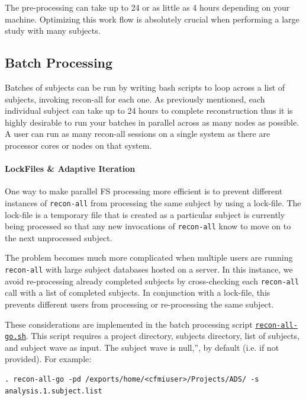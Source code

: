 \documentclass[paper=a4, fontsize=11pt]{scrartcl} %
\numberwithin{equation}{section} %
\numberwithin{figure}{section} %
\numberwithin{table}{section} %
\begin{document}
The pre-processing can take up to 24 or as little as 4 hours depending on your machine.  Optimizing this work flow is absolutely crucial when performing a large study with many subjects.
\subsection{Batch Processing}
Batches of subjects can be run by writing bash scripts to loop across a list of subjects, invoking recon-all for each one.  As previously mentioned, each individual subject can take up to 24 hours to complete reconstruction thus it is highly desirable to run your batches in parallel across as many nodes as possible.  A user can run as many recon-all sessions on a single system as there are processor cores or nodes on that system.  
\paragraph{LockFiles \& Adaptive Iteration} One way to make parallel FS processing more efficient is to prevent different instances of \texttt{recon-all} from processing the same subject by using a lock-file.  The lock-file is a temporary file that is created as a particular subject is currently being processed so that any new invocations of \texttt{recon-all} know to move on to the next unprocessed subject.  

The problem becomes much more complicated when multiple users are running \texttt{recon-all} with large subject databases hosted on a server.  In this instance, we avoid re-processing already completed subjects  by cross-checking each \texttt{recon-all} call with a list of completed subjects. In conjunction with a lock-file, this prevents different users from processing or re-processing the same subject.

These considerations are implemented in the batch processing script \href{https://www.dropbox.com/s/j7zmp29bkdeg9h5/recon-all-go.sh?dl=0}{\texttt{recon-all-go.sh}}.  This script requires a project directory, subjects directory, list of subjects, and subject wave as input.  The subject wave is null,'', by default (i.e. if not provided). For example:

\begin{lstlisting}
. recon-all-go -pd /exports/home/<cfmiuser>/Projects/ADS/ -s analysis.1.subject.list
\end{lstlisting}
\end{document}

